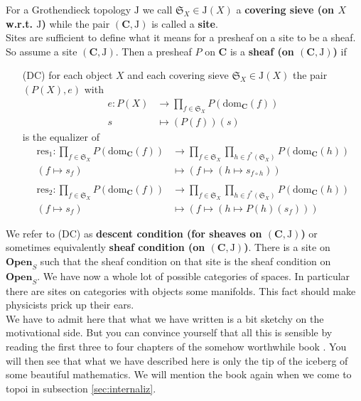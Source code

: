 \begin{exa}
\begin{enumerate}
\end{enumerate}
For a Grothendieck topology $\mathrm{J}$ we call $\mathfrak{S}_{X} \in \mathrm{J}(X)$ a \textbf{covering sieve (on $X$ w.r.t. $\mathrm{J}$)} while the pair $(\mathbf{C},\mathrm{J})$ is called a \textbf{site}.
\\
Sites are sufficient to define what it means for a presheaf on a site to be a sheaf. So assume a site $(\mathbf{C},\mathrm{J})$. Then a presheaf $P$ on $\mathbf{C}$ is a \textbf{sheaf (on $(\mathbf{C},\mathrm{J})$)} if
\begin{enumerate}
\item[(DC)]
for each object $X$ and each covering sieve $\mathfrak{S}_{X} \in \mathrm{J}(X)$ the pair $(P(X),e)$ with
\begin{align*}
  e
  \colon
  P(X)
  &\rightarrow
  \prod_{f \in \mathfrak{S}_{X}}
  P(\mathrm{dom}_{\mathbf{C}}(f))
  \\
  s
  &\mapsto
  (P(f))(s)
\end{align*}
is the equalizer of
\begin{align*}
  \mathrm{res}_{1}
  \colon
  \prod_{f \in \mathfrak{S}_{X}}
  P(\mathrm{dom}_{\mathbf{C}}(f))
  &\rightarrow
  \prod_{f \in \mathfrak{S}_{X}}
  \prod_{h \in f^{\ast}(\mathfrak{S}_{X})}
  P(\mathrm{dom}_{\mathbf{C}}(h))  
  \\
  \left(
    f
    \mapsto
    s_{f}
  \right)
  &\mapsto
  \left(
    f
    \mapsto
    \left(
      h
      \mapsto
      s_{f \circ h}
    \right)
  \right)
  \\\\
  \mathrm{res}_{2}
  \colon
  \prod_{f \in \mathfrak{S}_{X}}
  P(\mathrm{dom}_{\mathbf{C}}(f))
  &\rightarrow
  \prod_{f \in \mathfrak{S}_{X}}
  \prod_{h \in f^{\ast}(\mathfrak{S}_{X})}
  P(\mathrm{dom}_{\mathbf{C}}(h))  
  \\
  \left(
    f
    \mapsto
    s_{f}
  \right)
  &\mapsto
  \left(
    f
    \mapsto
    \left(
      h
      \mapsto
      P(h)(s_{f})
    \right)
  \right)
\end{align*}
\end{enumerate}
We refer to (DC) as \textbf{descent condition (for sheaves on $(\mathbf{C},\mathrm{J})$)} or sometimes equivalently \textbf{sheaf condition (on $(\mathbf{C},\mathrm{J})$)}. There is a site on $\mathbf{Open}_{S}$ such that the sheaf condition on that site is the sheaf condition on $\mathbf{Open}_{S}$. We have now a whole lot of possible categories of spaces. In particular there are sites on categories with objects some manifolds. This fact should make physicists prick up their ears.
\\
We have to admit here that what we have written is a bit sketchy on the motivational side. But you can convince yourself that all this is sensible by reading the first three to four chapters of the somehow worthwhile book \cite{c55c71e8}. You will then see that what we have described here is only the tip of the iceberg of some beautiful mathematics. We will mention the book again when we come to topoi in subsection \ref{sec:internaliz}.
\end{exa}
